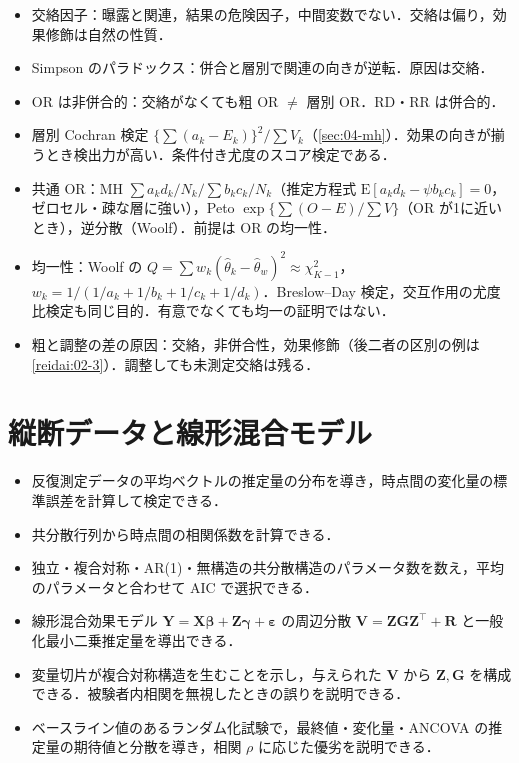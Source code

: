 \documentclass[a4paper,11pt,openany]{ltjsbook}
\newcommand{\E}{\mathrm{E}}
\newcommand{\transp}{^{\top}}
\begin{document}
\begin{summarybox}
\begin{itemize}
\item 交絡因子：曝露と関連，結果の危険因子，中間変数でない．交絡は偏り，効果修飾は自然の性質．
\item Simpson のパラドックス：併合と層別で関連の向きが逆転．原因は交絡．
\item OR は非併合的：交絡がなくても粗 OR $\ne$ 層別 OR．RD・RR は併合的．
\item 層別 Cochran 検定 $\{\sum(a_k-E_k)\}^2/\sum V_k$（\cref{sec:04-mh}）．効果の向きが揃うとき検出力が高い．条件付き尤度のスコア検定である．
\item 共通 OR：MH $\sum a_kd_k/N_k\big/\sum b_kc_k/N_k$（推定方程式 $\E[a_kd_k-\psi b_kc_k]=0$，ゼロセル・疎な層に強い），Peto $\exp\{\sum(O-E)/\sum V\}$（OR が1に近いとき），逆分散（Woolf）．前提は OR の均一性．
\item 均一性：Woolf の $Q=\sum w_k(\hat\theta_k-\hat\theta_w)^2\approx\chi^2_{K-1}$，$w_k=1/(1/a_k+1/b_k+1/c_k+1/d_k)$．Breslow--Day 検定，交互作用の尤度比検定も同じ目的．有意でなくても均一の証明ではない．
\item 粗と調整の差の原因：交絡，非併合性，効果修飾（後二者の区別の例は\cref{reidai:02-3}）．調整しても未測定交絡は残る．
\end{itemize}
\end{summarybox}

\chapter{縦断データと線形混合モデル}\label{ch:08}

\begin{goalbox}
\begin{itemize}
\item 反復測定データの平均ベクトルの推定量の分布を導き，時点間の変化量の標準誤差を計算して検定できる．
\item 共分散行列から時点間の相関係数を計算できる．
\item 独立・複合対称・AR(1)・無構造の共分散構造のパラメータ数を数え，平均のパラメータと合わせて AIC で選択できる．
\item 線形混合効果モデル $\bm Y=\bm X\bm\beta+\bm Z\bm\gamma+\bm\varepsilon$ の周辺分散 $\bm V=\bm Z\bm G\bm Z\transp+\bm R$ と一般化最小二乗推定量を導出できる．
\item 変量切片が複合対称構造を生むことを示し，与えられた $\bm V$ から $\bm Z,\bm G$ を構成できる．被験者内相関を無視したときの誤りを説明できる．
\item ベースライン値のあるランダム化試験で，最終値・変化量・ANCOVA の推定量の期待値と分散を導き，相関 $\rho$ に応じた優劣を説明できる．
\end{itemize}
\end{goalbox}
\end{document}
